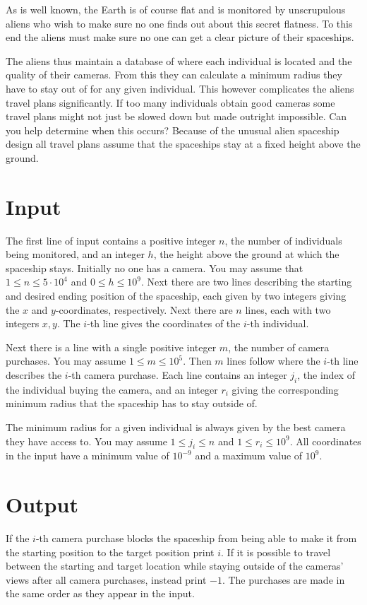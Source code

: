
As is well known, the Earth is of course flat and is monitored
by unscrupulous aliens who wish to make sure no one finds out
about this secret flatness. To this end the aliens must make
sure no one can get a clear picture of their spaceships.

The aliens thus maintain a database of where each individual
is located and the quality of their cameras.
From this they can calculate a minimum radius they have to
stay out of for any given individual. This however complicates
the aliens travel plans significantly. If too many individuals
obtain good cameras some travel plans might not just be slowed
down but made outright impossible. Can you help determine when
this occurs?
Because of the unusual alien spaceship design all travel plans
assume that the spaceships stay at a fixed height above the
ground.

\section*{Input}
The first line of input contains a positive integer $n$,
the number of individuals being monitored, and an integer
$h$, the height above the ground at which the spaceship stays.
Initially no one has a camera.
You may assume that $1 \leq n \leq 5 \cdot 10^4$ and $0 \leq h \leq 10^9$.
Next there are two lines describing the starting and desired
ending position of the spaceship, each given
by two integers giving the $x$ and $y$-coordinates,
respectively.
Next there are $n$ lines, each with two integers $x, y$.
The $i$-th line gives the coordinates of the $i$-th
individual.

Next there is a line with a single positive integer $m$,
the number of camera purchases.
You may assume $1 \leq m \leq 10^5$.
Then $m$ lines follow where the $i$-th line describes the $i$-th camera purchase.
Each line contains an integer $j_i$,
the index of the individual buying the camera,
and an integer $r_i$ giving the corresponding minimum radius
that the spaceship has to stay outside of.

The minimum radius for a given individual is always given
by the best camera they have access to.
You may assume $1 \leq j_i \leq n$ and $1 \leq r_i \leq 10^9$.
All coordinates in the input have a minimum value of
$10^{-9}$ and a maximum value of $10^9$.

\section*{Output}
If the $i$-th camera purchase blocks the spaceship from
being able to make it from the starting position to the
target position print $i$. If it is possible to travel 
between the starting and target location while staying outside of the cameras'
views after all camera purchases, instead print $-1$.
The purchases are made in the same order as they appear in the input.
